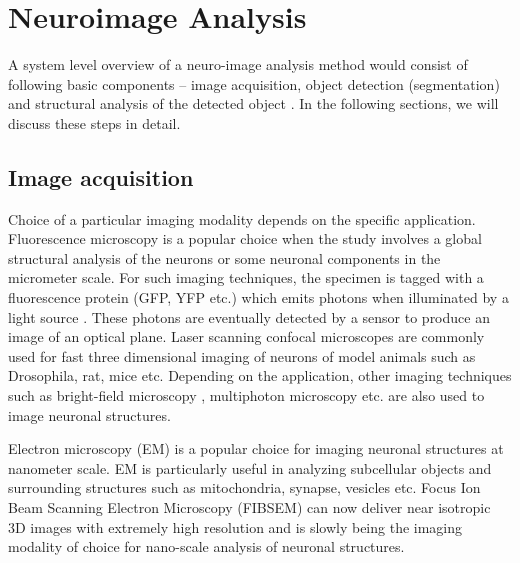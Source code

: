 \section{Neuroimage Analysis}
A system level overview of a neuro-image analysis method would consist of following basic components – image acquisition, object detection (segmentation) and structural analysis of the detected object \cite{meijering_survey}. In the following sections, we will discuss these steps in detail.

\subsection{Image acquisition}
Choice of a particular imaging modality depends on the specific application. Fluorescence microscopy is a popular choice when the study involves a global structural analysis of the neurons or some neuronal components in the micrometer scale. For such imaging techniques, the specimen is tagged with a fluorescence protein (GFP, YFP etc.) which emits photons when illuminated by a light source \cite{barry_branching}. These photons are eventually detected by a sensor to produce an image of an optical plane. Laser scanning confocal microscopes are commonly used for fast three dimensional imaging of neurons of model animals such as Drosophila, rat, mice etc. Depending on the application, other imaging techniques such as bright-field microscopy \cite{oberlaender2007transmitted}, multiphoton microscopy \cite{santamaria2007automatic} etc. are also used to image neuronal structures.   

Electron microscopy (EM) is a popular choice for imaging neuronal structures at nanometer scale. EM is particularly useful in analyzing subcellular objects and surrounding structures such as mitochondria, synapse, vesicles etc. Focus Ion Beam Scanning Electron Microscopy (FIBSEM) \cite{kreshuk2011automated} can now deliver near isotropic 3D images with extremely high resolution and is slowly being the imaging modality of choice for nano-scale analysis of neuronal structures. 

